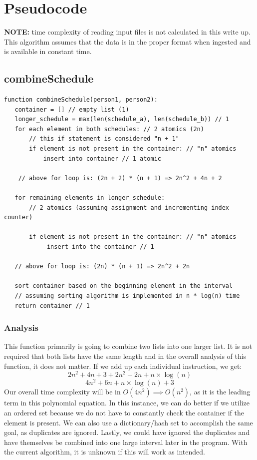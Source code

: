 \documentclass{article}
\begin{document}
\newpage

\section{Pseudocode}

\textbf{NOTE:} time complexity of reading input files is not calculated in this write up. This algorithm assumes that the data is in the proper format when ingested and is available in constant time.


\subsection{combineSchedule}

\begin{verbatim}
function combineSchedule(person1, person2):
   container = [] // empty list (1)
   longer_schedule = max(len(schedule_a), len(schedule_b)) // 1
   for each element in both schedules: // 2 atomics (2n)
       // this if statement is considered "n + 1"
       if element is not present in the container: // "n" atomics
           insert into container // 1 atomic

    // above for loop is: (2n + 2) * (n + 1) => 2n^2 + 4n + 2

   for remaining elements in longer_schedule: 
       // 2 atomics (assuming assignment and incrementing index counter)

       if element is not present in the container: // "n" atomics
            insert into the container // 1
   
   // above for loop is: (2n) * (n + 1) => 2n^2 + 2n

   sort container based on the beginning element in the interval
   // assuming sorting algorithm is implemented in n * log(n) time
   return container // 1

\end{verbatim}


\subsubsection{Analysis}

This function primarily is going to combine two lists into one larger list.
It is not required that both lists have the same length and in the overall analysis of this function, it does not matter.
If we add up each individual instruction, we get:
$$ 2n^{2} + 4n + 3 + 2n^{2} + 2n + n \times \log(n)$$
$$ 4n^{2} + 6n + n \times \log(n) + 3$$
Our overall time complexity will be in $O(4n^{2}) \implies O(n^{2})$, as it is the leading term in this polynomial equation.
In this instance, we can do better if we utilize an ordered set because we do not have to constantly check the container if the element is present.
We can also use a dictionary/hash set to accomplish the same goal, as duplicates are ignored.
Lastly, we could have ignored the duplicates and have themselves be combined into one large interval later in the program.
With the current algorithm, it is unknown if this will work as intended.
\end{document}
